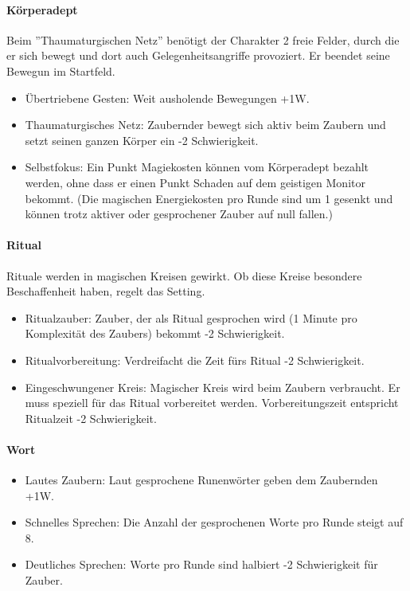 \documentclass{article}
\begin{document}
\paragraph{Körperadept}

Beim ''Thaumaturgischen Netz'' benötigt der Charakter 2 freie Felder, durch die er sich bewegt und dort auch Gelegenheitsangriffe provoziert. Er beendet seine Bewegun im Startfeld.

\begin{itemize}
\item Übertriebene Gesten: Weit ausholende Bewegungen +1W.
\item Thaumaturgisches Netz: Zaubernder bewegt sich aktiv beim Zaubern und setzt seinen ganzen Körper ein -2 Schwierigkeit.
\item Selbstfokus: Ein Punkt Magiekosten können vom Körperadept bezahlt werden, ohne dass er einen Punkt Schaden auf dem geistigen Monitor bekommt. (Die magischen Energiekosten pro Runde sind um 1 gesenkt und können trotz aktiver oder gesprochener Zauber auf null fallen.)
\end{itemize}

\paragraph{Ritual}

Rituale werden in magischen Kreisen gewirkt. Ob diese Kreise besondere Beschaffenheit haben, regelt das Setting.

\begin{itemize}
\item Ritualzauber: Zauber, der als Ritual gesprochen wird (1 Minute pro Komplexität des Zaubers) bekommt -2 Schwierigkeit.
\item Ritualvorbereitung: Verdreifacht die Zeit fürs Ritual -2 Schwierigkeit.
\item Eingeschwungener Kreis: Magischer Kreis wird beim Zaubern verbraucht. Er muss speziell für das Ritual vorbereitet werden. Vorbereitungszeit entspricht Ritualzeit -2 Schwierigkeit.
\end{itemize}

\paragraph{Wort}

\begin{itemize}
\item Lautes Zaubern: Laut gesprochene Runenwörter geben dem Zaubernden +1W.
\item Schnelles Sprechen: Die Anzahl der gesprochenen Worte pro Runde steigt auf 8.
\item Deutliches Sprechen: Worte pro Runde sind halbiert -2 Schwierigkeit für Zauber.
\end{itemize}
\end{document}
